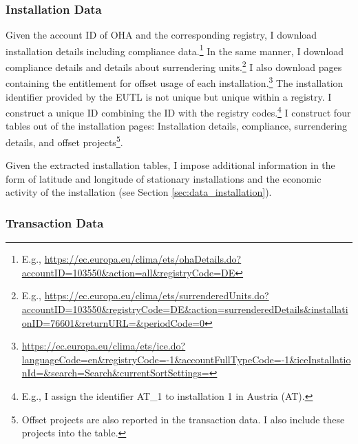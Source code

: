 \documentclass[authoryear]{elsarticle}
\begin{document}
\subsubsection{Installation Data}
Given the account ID of OHA and the corresponding registry, I download installation details including compliance data.\footnote{E.g., \url{https://ec.europa.eu/clima/ets/ohaDetails.do?accountID=103550&action=all&registryCode=DE}} In the same manner, I download compliance details and details about surrendering units.\footnote{E.g., \url{https://ec.europa.eu/clima/ets/surrenderedUnits.do?accountID=103550&registryCode=DE&action=surrenderedDetails&installationID=76601&returnURL=&periodCode=0}} I also download pages containing the entitlement for offset usage of each installation.\footnote{\url{https://ec.europa.eu/clima/ets/ice.do?languageCode=en&registryCode=-1&accountFullTypeCode=-1&iceInstallationId=&search=Search&currentSortSettings=}} The installation identifier provided by the EUTL is not unique but unique within a registry. I construct a unique ID combining the ID with the registry codes.\footnote{E.g., I assign the identifier AT\_1 to installation 1 in Austria (AT).} I construct four tables out of the installation pages: Installation details, compliance, surrendering details, and offset projects\footnote{Offset projects are also reported in the transaction data. I also include these projects into the table.}. 

Given the extracted installation tables, I impose additional information in the form of latitude and longitude of stationary installations and the economic activity of the installation (see Section \ref{sec:data_installation}).

\subsubsection{Transaction Data}
\end{document}
